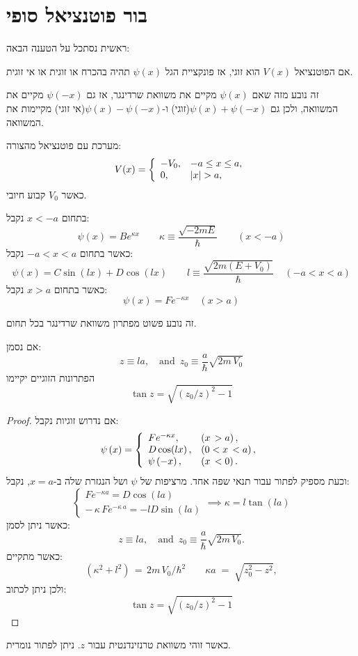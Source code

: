 \documentclass{tstextbook}
\begin{document}
\section{בור פוטנציאל סופי}

ראשית נסתכל על הטענה הבאה:

\begin{proposition}
אם הפוטנציאל \(V(x)\) הוא זוגי, אז פונקציית הגל \(\psi(x)\) תהיה בהכרח או זוגית או אי זוגית.

\end{proposition}
זה נובע מזה שאם \(\psi(x)\) מקיים את משוואת שרדינגר, אז גם \(\psi(-x)\) מקיים את המשוואה, ולכן גם \(\psi(x)+\psi(-x)\)(זוגי) ו-\(\psi(x)-\psi(-x)\)(אי זוגי) מקיימות את המשוואה. 

\begin{definition}
מערכת עם פוטנציאל מהצורה:
$$V(x)=\left\{\begin{array}{l l}{{-V_{0},}}&{{-a\le x\le a,}}\\ {{0,}}&{{\vert x\vert>a,}}\end{array}\right.$$
כאשר \(V_{0}\) קבוע חיובי.

\end{definition}
\begin{proposition}
בתחום \(x<-a\) נקבל:
$$\psi(x)=B e^{\kappa x}\qquad \kappa\equiv{\frac{\sqrt{-2m E}}{\hbar}}\qquad (x<-a)$$
כאשר בתחום \(-a<x<a\) נקבל:
$$\psi(x)=C\sin(l x)+D\cos(l x)\qquad l\equiv{\frac{\sqrt{2m\left(E+V_{0}\right)}}{\hbar}}\;\;\;\;(-a<x<a)$$
כאשר בתחום \(x>a\) נקבל:
$$\psi(x)=F e^{-\kappa x}\quad(x>a)$$

\end{proposition}
זה נובע פשוט מפתרון משוואת שרדינגר בכל תחום. 

\begin{proposition}
אם נסמן:
$$z\equiv l a,\quad\mathrm{and}\,\,\,z_{0}\equiv\frac{a}{\hbar}\sqrt{2m\,V_{0}}$$
הפתרונות הזוגיים יקיימו
$$\tan z={\sqrt{(z_{0}/z)^{2}-1}}$$

\end{proposition}
\begin{proof}
אם נדרוש זוגיות נקבל:
$$\psi\left(x\right)=\left\{\begin{array}{l l}{{F e^{-\kappa x},}}&{{\left(x\,>a\right),}}\\ {{D\cos(l x)\,,}}&{{\left(0<x\,<a\right),}}\\ {{\psi\left(-x\right),}}&{{\left(x\,<0\right).}}\end{array}\right.$$
וכעת מספיק לפתור עבור תנאי שפה אחד. מרציפות של \(\psi\) ושל הנגזרת שלה ב-\(x=a\), נקבל:
$$\begin{cases}F e^{-\kappa a}=D\cos(l a) \\-\,\kappa\,F e^{-\kappa\,a}=-l D\sin(l a)
\end{cases}\implies \kappa=l\tan(l a)$$
כאשר ניתן לסמן:
$$z\equiv l a,\quad\mathrm{and}\,\,\,z_{0}\equiv\frac{a}{\hbar}\sqrt{2m\,V_{0}}.$$
כאשר מתקיים:
$$\left(\kappa^{2}+l^{2}\right)\,=\,2m\,V_{0}/\hbar^{2}\qquad \kappa a\;=\;\sqrt{z_{0}^{2}-z^{2}},$$
ולכן ניתן לכתוב:
$$\tan z={\sqrt{(z_{0}/z)^{2}-1}}$$

\end{proof}
כאשר זוהי משוואת טרנזינדנטית עבור \(z\). ניתן לפתור נומרית.
\end{document}
